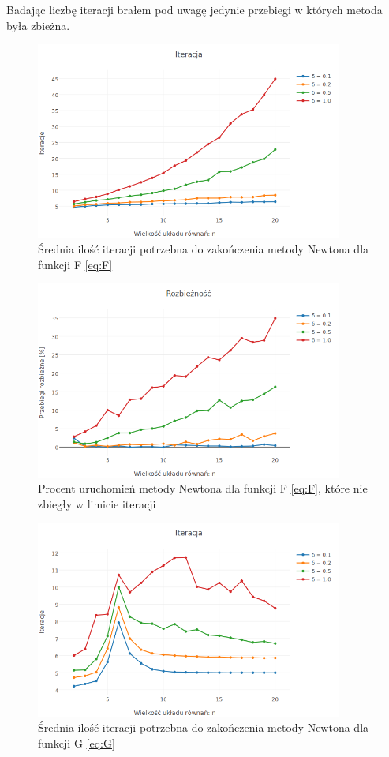 \documentclass[11pt,wide]{mwart}
\begin{document}
Badając liczbę iteracji brałem pod uwagę jedynie przebiegi w których metoda była zbieżna.
\begin{figure}[h]
    \centering
    \includegraphics[width=0.9\textwidth]{avg_iterations_F}
    \caption{Średnia ilość iteracji potrzebna do zakończenia metody Newtona dla funkcji F \eqref{eq:F}}
    \label{fig:avgiterationsF}
\end{figure}
\begin{figure}[h]
    \centering
    \includegraphics[width=0.9\textwidth]{avg_diversions_F}
    \caption{Procent uruchomień metody Newtona dla funkcji F \eqref{eq:F}, które nie zbiegły w limicie iteracji}
    \label{fig:avgdiversionsF}
\end{figure}
\begin{figure}[h]
    \centering
    \includegraphics[width=0.9\textwidth]{avg_iterations_G}
    \caption{Średnia ilość iteracji potrzebna do zakończenia metody Newtona dla funkcji G \eqref{eq:G}}
    \label{fig:avgiterationsG}
\end{figure}
\end{document}
